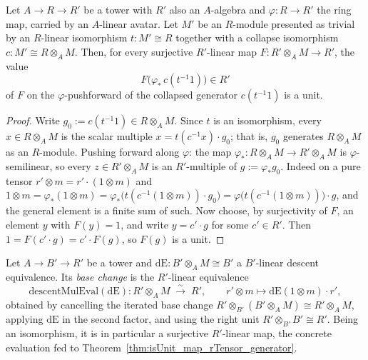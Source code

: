 \begin{theorem}
  \label{thm:isUnit_map_rTensor_generator}
  \leanok
  Let \(A \to R \to R'\) be a tower with \(R'\) also an \(A\)-algebra and \(\varphi \colon R \to
  R'\) the ring map, carried by an \(A\)-linear avatar.  Let \(M'\) be an \(R\)-module presented
  as trivial by an \(R\)-linear isomorphism \(t \colon M' \cong R\) together with a collapse
  isomorphism \(c \colon M' \cong R \otimes_A M\).  Then, for every surjective \(R'\)-linear map
  \(F \colon R' \otimes_A M \to R'\), the value
  \[
    F\bigl(\varphi_{*}\,c(t^{-1} 1)\bigr) \in R'
  \]
  of \(F\) on the \(\varphi\)-pushforward of the collapsed generator \(c(t^{-1} 1)\) is a unit.
\end{theorem}
\begin{proof}
  \leanok
  Write \(g_0 := c(t^{-1} 1) \in R \otimes_A M\).  Since \(t\) is an isomorphism, every \(x \in
  R \otimes_A M\) is the scalar multiple \(x = t(c^{-1} x) \cdot g_0\); that is, \(g_0\)
  generates \(R \otimes_A M\) as an \(R\)-module.  Pushing forward along \(\varphi\): the map
  \(\varphi_{*} \colon R \otimes_A M \to R' \otimes_A M\) is \(\varphi\)-semilinear, so every
  \(z \in R' \otimes_A M\) is an \(R'\)-multiple of \(g := \varphi_{*} g_0\).  Indeed on a pure
  tensor \(r' \otimes m = r' \cdot (1 \otimes m)\) and \(1 \otimes m = \varphi_{*}(1 \otimes m)
  = \varphi_{*}\bigl(t(c^{-1}(1 \otimes m)) \cdot g_0\bigr) = \varphi\bigl(t(c^{-1}(1 \otimes
  m))\bigr) \cdot g\), and the general element is a finite sum of such.  Now choose, by
  surjectivity of \(F\), an element \(y\) with \(F(y) = 1\), and write \(y = c' \cdot g\) for
  some \(c' \in R'\).  Then \(1 = F(c' \cdot g) = c' \cdot F(g)\), so \(F(g)\) is a unit.
\end{proof}

\begin{definition}
  \label{def:descentMulEval}
  \leanok
  Let \(A \to B' \to R'\) be a tower and \(\mathrm{dE} \colon B' \otimes_A M \cong B'\) a
  \(B'\)-linear descent equivalence.  Its \emph{base change} is the \(R'\)-linear equivalence
  \[
    \mathrm{descentMulEval}(\mathrm{dE}) \colon R' \otimes_A M \;\xrightarrow{\ \sim\ }\; R',
    \qquad r' \otimes m \longmapsto \mathrm{dE}(1 \otimes m) \cdot r',
  \]
  obtained by cancelling the iterated base change \(R' \otimes_{B'} (B' \otimes_A M) \cong R'
  \otimes_A M\), applying \(\mathrm{dE}\) in the second factor, and using the right unit \(R'
  \otimes_{B'} B' \cong R'\).  Being an isomorphism, it is in particular a surjective
  \(R'\)-linear map, the concrete evaluation fed to Theorem~\ref{thm:isUnit_map_rTensor_generator}.
\end{definition}

